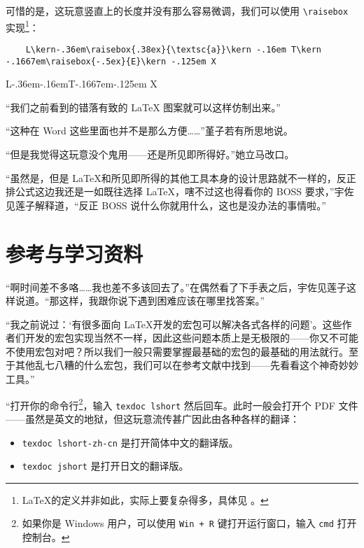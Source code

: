 可惜的是，这玩意竖直上的长度并没有那么容易微调，我们可以使用 \verb"\raisebox" 实现\footnote{\LaTeX 的定义并非如此，实际上要复杂得多，具体见  \textcite[The \LaTeXe{} Sources]{braams2003latex2varepsilon} 。}：

\begin{lstlisting}
    L\kern-.36em\raisebox{.38ex}{\textsc{a}}\kern -.16em T\kern -.1667em\raisebox{-.5ex}{E}\kern -.125em X
\end{lstlisting}

\begin{center}
    L\kern-.36em\kern-.16emT\kern -.1667em\raisebox{-.5ex}{E}\kern -.125em X
\end{center}

“我们之前看到的错落有致的 \LaTeX{} 图案就可以这样仿制出来。”

“这种在 Word 这些里面也并不是那么方便……”堇子若有所思地说。

“但是我觉得这玩意没个鬼用——还是所见即所得好。”她立马改口。

“虽然是，但是 \LaTeX 和所见即所得的其他工具本身的设计思路就不一样的，反正排公式这边我还是一如既往选择 \LaTeX，嗐不过这也得看你的 BOSS 要求，”宇佐见莲子解释道，“反正 BOSS 说什么你就用什么，这也是没办法的事情啦。”

\section{参考与学习资料}

“啊时间差不多咯……我也差不多该回去了。”在偶然看了下手表之后，宇佐见莲子这样说道。“那这样，我跟你说下遇到困难应该在哪里找答案。”

“我之前说过：‘有很多面向 \LaTeX 开发的宏包可以解决各式各样的问题’。这些作者们开发的宏包实现当然不一样，因此这些问题本质上是无极限的——你又不可能不使用宏包对吧？所以我们一般只需要掌握最基础的宏包的最基础的用法就行。至于其他乱七八糟的什么宏包，我们可以在参考文献中找到——先看看这个神奇妙妙工具。”

“打开你的命令行\footnote{如果你是 Windows 用户，可以使用 \texttt{Win + R} 键打开运行窗口，输入 \texttt{cmd} 打开控制台。}，输入 \verb"texdoc lshort" 然后回车。此时一般会打开个 PDF 文件 \textcite[LShort]{oetiker2003not}
——虽然是英文的地狱，但这玩意流传甚广因此由各种各样的翻译：

\begin{itemize}
    \item  \verb"texdoc lshort-zh-cn" 是打开简体中文的翻译版。
    \item  \verb"texdoc jshort" 是打开日文的翻译版。
\end{itemize}

